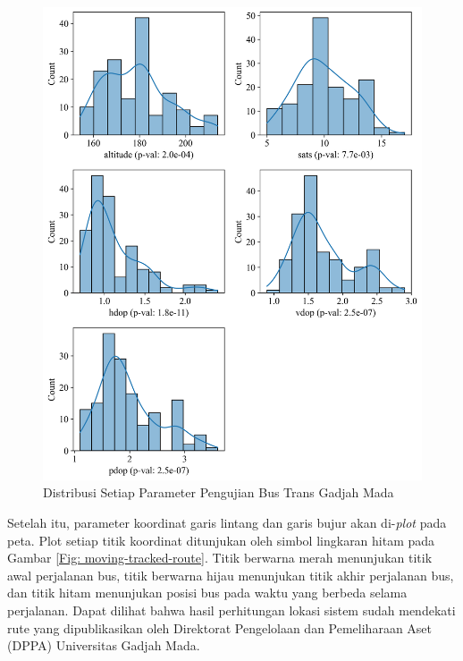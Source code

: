 \begin{figure}[H]
	\centering
	\includegraphics[width=14cm]{contents/chapter-4/pengujian-bergerak/distribusi.png}
	\caption{Distribusi Setiap Parameter Pengujian Bus Trans Gadjah Mada}
	\label{Fig: moving-distribusi}
\end{figure}

Setelah itu, parameter koordinat garis lintang dan garis bujur akan di-\textit{plot} pada peta. Plot setiap titik koordinat ditunjukan oleh simbol lingkaran hitam pada Gambar \ref{Fig: moving-tracked-route}. Titik berwarna merah menunjukan titik awal perjalanan bus, titik berwarna hijau menunjukan titik akhir perjalanan bus, dan titik hitam menunjukan posisi bus pada waktu yang berbeda selama perjalanan. Dapat dilihat bahwa hasil perhitungan lokasi sistem sudah mendekati rute yang dipublikasikan oleh Direktorat Pengelolaan dan Pemeliharaan Aset (DPPA) Universitas Gadjah Mada.

